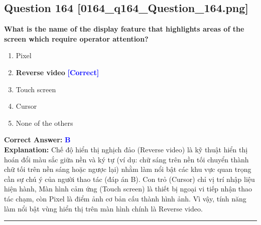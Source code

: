 \documentclass[11pt,a4paper]{article}
\begin{document}
\begin{minipage}{\textwidth}
\subsection*{Question 164 \quad \footnotesize{[0164\_q164\_Question\_164.png]}}
\noindent \textbf{What is the name of the display feature that highlights areas of the screen which require operator attention?}

\begin{enumerate}[label=\Alph*.]
    \item Pixel
    \item \textbf{Reverse video} \hfill \textcolor{blue}{\textbf{[Correct]}}
    \item Touch screen
    \item Cursor
    \item None of the others
\end{enumerate}

\noindent \textbf{Correct Answer:} \textcolor{blue}{\textbf{B}} \\[2pt]
\noindent \textbf{Explanation:} Chế độ hiển thị nghịch đảo (Reverse video) là kỹ thuật hiển thị hoán đổi màu sắc giữa nền và ký tự (ví dụ: chữ sáng trên nền tối chuyển thành chữ tối trên nền sáng hoặc ngược lại) nhằm làm nổi bật các khu vực quan trọng cần sự chú ý của người thao tác (đáp án B). Con trỏ (Cursor) chỉ vị trí nhập liệu hiện hành, Màn hình cảm ứng (Touch screen) là thiết bị ngoại vi tiếp nhận thao tác chạm, còn Pixel là điểm ảnh cơ bản cấu thành hình ảnh. Vì vậy, tính năng làm nổi bật vùng hiển thị trên màn hình chính là Reverse video.

\par\vspace{0.3cm}
\hrule
\vspace{0.3cm}
\end{minipage}
\end{document}
